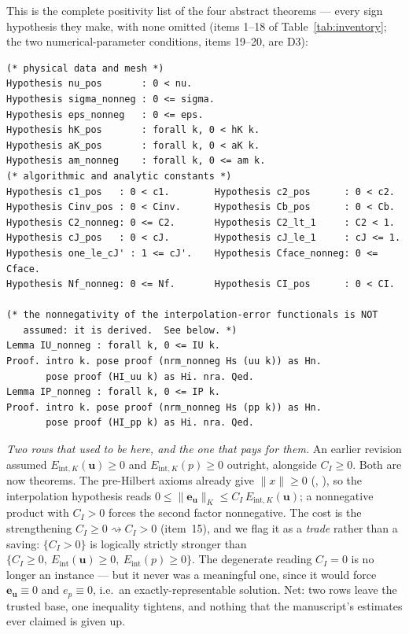 \documentclass[11pt]{article}
\newcommand{\coq}[1]{\texttt{\detokenize{#1}}}
\newcommand{\file}[1]{\texttt{\detokenize{#1}}}
\begin{document}
This is the complete positivity list of the four abstract theorems --- every
sign hypothesis they make, with none omitted (items 1--18 of
Table~\ref{tab:inventory}; the two numerical-parameter conditions, items 19--20,
are D3):
\begin{lstlisting}
(* physical data and mesh *)
Hypothesis nu_pos       : 0 < nu.
Hypothesis sigma_nonneg : 0 <= sigma.
Hypothesis eps_nonneg   : 0 <= eps.
Hypothesis hK_pos       : forall k, 0 < hK k.
Hypothesis aK_pos       : forall k, 0 < aK k.
Hypothesis am_nonneg    : forall k, 0 <= am k.
(* algorithmic and analytic constants *)
Hypothesis c1_pos   : 0 < c1.        Hypothesis c2_pos      : 0 < c2.
Hypothesis Cinv_pos : 0 < Cinv.      Hypothesis Cb_pos      : 0 < Cb.
Hypothesis C2_nonneg: 0 <= C2.       Hypothesis C2_lt_1     : C2 < 1.
Hypothesis cJ_pos   : 0 < cJ.        Hypothesis cJ_le_1     : cJ <= 1.
Hypothesis one_le_cJ' : 1 <= cJ'.    Hypothesis Cface_nonneg: 0 <= Cface.
Hypothesis Nf_nonneg: 0 <= Nf.       Hypothesis CI_pos      : 0 < CI.

(* the nonnegativity of the interpolation-error functionals is NOT
   assumed: it is derived.  See below. *)
Lemma IU_nonneg : forall k, 0 <= IU k.
Proof. intro k. pose proof (nrm_nonneg Hs (uu k)) as Hn.
       pose proof (HI_uu k) as Hi. nra. Qed.
Lemma IP_nonneg : forall k, 0 <= IP k.
Proof. intro k. pose proof (nrm_nonneg Hs (pp k)) as Hn.
       pose proof (HI_pp k) as Hi. nra. Qed.
\end{lstlisting}

\emph{Two rows that used to be here, and the one that pays for them.} An earlier
revision assumed $E_{\mathrm{int},K}(\mathbf u)\ge0$ and
$E_{\mathrm{int},K}(p)\ge0$ outright, alongside $C_I\ge0$. Both are now theorems.
The pre-Hilbert axioms already give $\lVert x\rVert\ge0$
(\coq{nrm_nonneg}, \file{InnerSpace.v}), so the interpolation hypothesis
\coq{HI_uu} reads $0\le\lVert\mathbf e_{\mathbf u}\rVert_K\le
C_I\,E_{\mathrm{int},K}(\mathbf u)$; a nonnegative product with $C_I>0$ forces
the second factor nonnegative. The cost is the strengthening
$C_I\ge0\rightsquigarrow C_I>0$ (item~15), and we flag it as a \emph{trade}
rather than a saving: $\{C_I>0\}$ is logically strictly stronger than
$\{C_I\ge0,\ E_{\mathrm{int}}(\mathbf u)\ge0,\ E_{\mathrm{int}}(p)\ge0\}$. The
degenerate reading $C_I=0$ is no longer an instance --- but it never was a
meaningful one, since it would force $\mathbf e_{\mathbf u}\equiv0$ and $e_p\equiv0$,
i.e.\ an exactly-representable solution. Net: two rows leave the trusted base,
one inequality tightens, and nothing that the manuscript's estimates ever
claimed is given up.
\end{document}
